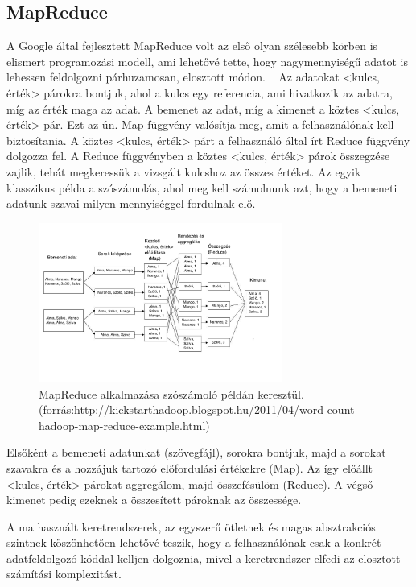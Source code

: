 \documentclass[a4paper,12pt]{article}
\begin{document}
\subsection{MapReduce}
A Google által fejlesztett MapReduce volt az első olyan szélesebb körben is elismert programozási modell, ami lehetővé tette, hogy nagymennyiségű adatot is lehessen feldolgozni párhuzamosan, elosztott módon. ~\cite{mapreduce} Az adatokat <kulcs, érték> párokra bontjuk, ahol a kulcs egy referencia, ami hivatkozik az adatra, míg az érték maga az adat. A bemenet az adat, míg a kimenet a köztes <kulcs, érték> pár. Ezt az ún. Map függvény valósítja meg, amit a felhasználónak kell biztosítania. A köztes <kulcs, érték> párt a felhasználó által írt Reduce függvény dolgozza fel. A Reduce függvényben a köztes <kulcs, érték> párok összegzése  zajlik, tehát megkeressük a vizsgált kulcshoz az összes értéket. \linebreak
Az egyik klasszikus példa a szószámolás, ahol meg kell számolnunk azt, hogy a bemeneti adatunk szavai milyen mennyiséggel fordulnak elő.

\begin{figure}[ht!]
\centering
\includegraphics[width=80mm]{img/wordcountflow.jpg}
\caption{MapReduce alkalmazása  szószámoló példán keresztül. (forrás:http://kickstarthadoop.blogspot.hu/2011/04/word-count-hadoop-map-reduce-example.html)
\label{wordcountflow}}
\end{figure}

Elsőként a bemeneti adatunkat (szövegfájl), sorokra bontjuk, majd a sorokat szavakra és a hozzájuk tartozó előfordulási értékekre (Map). Az így előállt <kulcs, érték> párokat aggregálom, majd összefésülöm (Reduce). A végső kimenet pedig ezeknek a összesített pároknak az összessége.

A ma használt keretrendszerek, az egyszerű ötletnek és magas absztrakciós szintnek köszönhetően lehetővé teszik, hogy a felhasználónak csak a konkrét adatfeldolgozó kóddal kelljen dolgoznia, mivel a keretrendszer elfedi az elosztott számítási komplexitást. ~\cite{hadoop}
\end{document}
